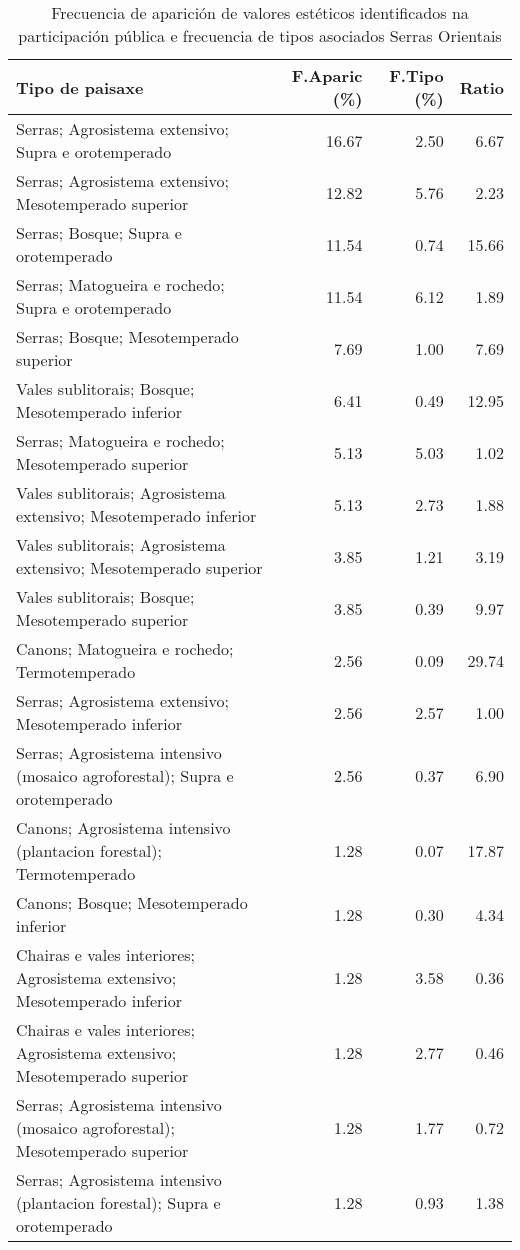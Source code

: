 \begin{table}[p]
\centering
\caption{Frecuencia de aparición de valores estéticos identificados na participación pública e frecuencia de tipos asociados Serras Orientais} 
\label{vsixotest5}
\begin{tabular}{lrrr}
  \hline
Tipo de paisaxe & F.Aparic (\%) & F.Tipo (\%) & Ratio \\ 
  \hline
Serras; Agrosistema extensivo; Supra e orotemperado & 16.67 & 2.50 & 6.67 \\ 
  Serras; Agrosistema extensivo; Mesotemperado superior & 12.82 & 5.76 & 2.23 \\ 
  Serras; Bosque; Supra e orotemperado & 11.54 & 0.74 & 15.66 \\ 
  Serras; Matogueira e rochedo; Supra e orotemperado & 11.54 & 6.12 & 1.89 \\ 
  Serras; Bosque; Mesotemperado superior & 7.69 & 1.00 & 7.69 \\ 
  Vales sublitorais; Bosque; Mesotemperado inferior & 6.41 & 0.49 & 12.95 \\ 
  Serras; Matogueira e rochedo; Mesotemperado superior & 5.13 & 5.03 & 1.02 \\ 
  Vales sublitorais; Agrosistema extensivo; Mesotemperado inferior & 5.13 & 2.73 & 1.88 \\ 
  Vales sublitorais; Agrosistema extensivo; Mesotemperado superior & 3.85 & 1.21 & 3.19 \\ 
  Vales sublitorais; Bosque; Mesotemperado superior & 3.85 & 0.39 & 9.97 \\ 
  Canons; Matogueira e rochedo; Termotemperado & 2.56 & 0.09 & 29.74 \\ 
  Serras; Agrosistema extensivo; Mesotemperado inferior & 2.56 & 2.57 & 1.00 \\ 
  Serras; Agrosistema intensivo (mosaico agroforestal); Supra e orotemperado & 2.56 & 0.37 & 6.90 \\ 
  Canons; Agrosistema intensivo (plantacion forestal); Termotemperado & 1.28 & 0.07 & 17.87 \\ 
  Canons; Bosque; Mesotemperado inferior & 1.28 & 0.30 & 4.34 \\ 
  Chairas e vales interiores; Agrosistema extensivo; Mesotemperado inferior & 1.28 & 3.58 & 0.36 \\ 
  Chairas e vales interiores; Agrosistema extensivo; Mesotemperado superior & 1.28 & 2.77 & 0.46 \\ 
  Serras; Agrosistema intensivo (mosaico agroforestal); Mesotemperado superior & 1.28 & 1.77 & 0.72 \\ 
  Serras; Agrosistema intensivo (plantacion forestal); Supra e orotemperado & 1.28 & 0.93 & 1.38 \\ 
   \hline
\end{tabular}
\end{table}
